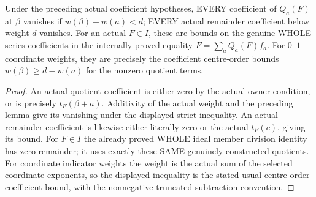 \begin{theorem}
\label{hir:actual-formal-division-quotient-remainder-weight-bounds}
Under the preceding actual coefficient hypotheses, EVERY coefficient
of $Q_a(F)$ at $\beta$ vanishes if $w(\beta)+w(a)<d$;
EVERY actual remainder coefficient below weight $d$ vanishes.
For an actual $F\in I$, these are bounds on the genuine WHOLE series
coefficients in the internally proved equality $F=\sum_aQ_a(F)f_a$.
For $0$--$1$ coordinate weights, they are precisely the coefficient
centre-order bounds $w(\beta)\ge d-w(a)$ for the nonzero quotient terms.
\leanok
\end{theorem}
\begin{proof}
An actual quotient coefficient is either zero by the actual owner condition,
or is precisely $t_F(\beta+a)$. Additivity of the actual weight and
the preceding lemma give its vanishing under the displayed strict
inequality. An actual remainder coefficient is likewise either literally
zero or the actual $t_F(c)$, giving its bound. For $F\in I$ the
already proved WHOLE ideal member division identity has zero remainder;
it uses exactly these SAME genuinely constructed quotients. For coordinate
indicator weights the weight is the actual sum of the selected coordinate
exponents, so the displayed inequality is the stated usual centre-order
coefficient bound, with the nonnegative truncated subtraction convention.
\end{proof}

